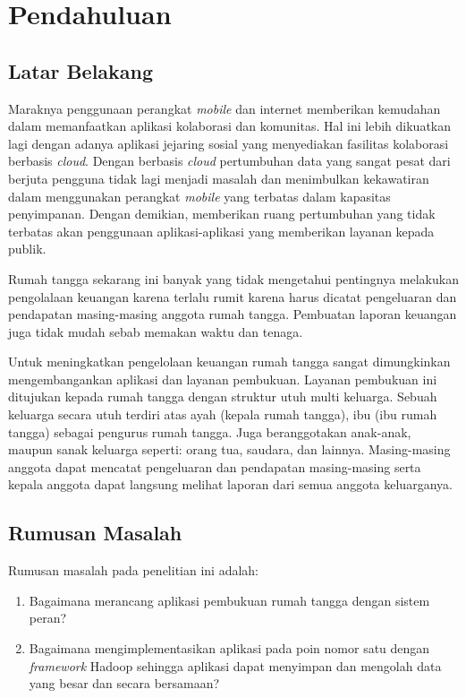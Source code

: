\chapter{Pendahuluan}
\label{chap:pendahuluan}

\section{Latar Belakang}
\label{sec:latarbelakang}
Maraknya penggunaan perangkat \textit{mobile} dan internet memberikan kemudahan dalam memanfaatkan aplikasi kolaborasi dan komunitas. Hal ini lebih dikuatkan lagi dengan adanya aplikasi jejaring sosial yang menyediakan fasilitas kolaborasi berbasis \textit{cloud}. Dengan berbasis \textit{cloud} pertumbuhan data yang sangat pesat dari berjuta pengguna tidak lagi menjadi masalah dan menimbulkan kekawatiran dalam menggunakan perangkat \textit{mobile} yang terbatas dalam kapasitas penyimpanan. Dengan demikian, memberikan ruang pertumbuhan yang tidak terbatas akan penggunaan aplikasi-aplikasi yang memberikan layanan kepada publik. 

Rumah tangga sekarang ini banyak yang tidak mengetahui pentingnya melakukan pengolalaan keuangan karena terlalu rumit karena harus dicatat pengeluaran dan pendapatan masing-masing anggota rumah tangga. Pembuatan laporan keuangan juga tidak mudah sebab memakan waktu dan tenaga.

Untuk meningkatkan pengelolaan keuangan rumah tangga sangat dimungkinkan mengembangankan aplikasi dan layanan pembukuan. Layanan pembukuan ini ditujukan kepada rumah tangga dengan struktur utuh multi keluarga. Sebuah keluarga secara utuh terdiri atas ayah (kepala rumah tangga), ibu (ibu rumah tangga) sebagai pengurus rumah tangga. Juga beranggotakan anak-anak, maupun sanak keluarga seperti: orang tua, saudara, dan lainnya. Masing-masing anggota dapat mencatat pengeluaran dan pendapatan masing-masing serta kepala anggota dapat langsung melihat laporan dari semua anggota keluarganya.

\section{Rumusan Masalah}
\label{sec:rumusanmalasah}

Rumusan masalah pada penelitian ini adalah:
\begin{enumerate}
\item Bagaimana merancang aplikasi pembukuan rumah tangga dengan sistem peran?
\item Bagaimana mengimplementasikan aplikasi pada poin nomor satu dengan \textit{framework} Hadoop sehingga aplikasi dapat menyimpan dan mengolah data yang besar dan secara bersamaan?
\end{enumerate}

